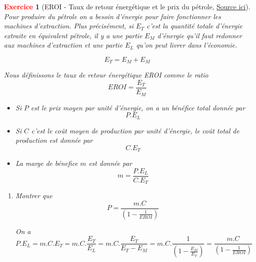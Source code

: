 \documentclass[11pt]{article}
\theoremstyle{mythmstyle}
\newtheorem{exo}{\textcolor{red}{\textbf{Exercice}}}
\begin{document}
\begin{exo}[EROI - Taux de retour énergétique et le prix du pétrole, \href{https://www.sciencedirect.com/science/article/pii/S0301421511006975}{Source ici}]
Pour produire du pétrole on a besoin d'énergie pour faire  fonctionner les machines d'extraction. Plus précisément, si $E_T$ c'est la quantité totale d'énergie extraite en équivalent pétrole, il y a une partie $E_{M}$ d'énergie qu'il faut redonner aux machines d'extraction et une partie $E_{L}$ qu'on peut livrer dans l'économie.

\begin{center}
\end{center}


$$E_T= E_{M}+ E_{M}$$


Nous définissons le taux de retour énergétique EROI comme le ratio
$$
EROI=\frac{E_{T}}{E_{M}}
$$

\begin{itemize}
    \item Si $P$ est le prix moyen par unité d’énergie, on a un bénéfice total donnée par
    $$ P. E_{L}$$
    
    \item Si $C$ c'est le coût moyen de production par unité d'énergie, le coût total de production est donnée par 
    $$
    C. E_{T}
    $$
    \item La marge de bénefice $m$ est donnée par
    $$
    m=\frac{P. E_{L}}{C. E_{T}}
    $$
    

    
\end{itemize}

\begin{enumerate}
    \item Montrer que
    $$
    P=\frac{m.C}{(1-\frac{1}{EROI})}
    $$

\begin{solution}
    On a $$P. E_{L}= m.C.E_T=m.C.\frac{E_T}{E_L}=m.C.\frac{E_T}{E_T-E_M}=m.C.\frac{1}{(1-
    \frac{E_M}{E_T})}=\frac{m.C}{(1-
    \frac{1}{EROI})}$$
\end{solution}
    

\end{enumerate}
\end{exo}
\end{document}

